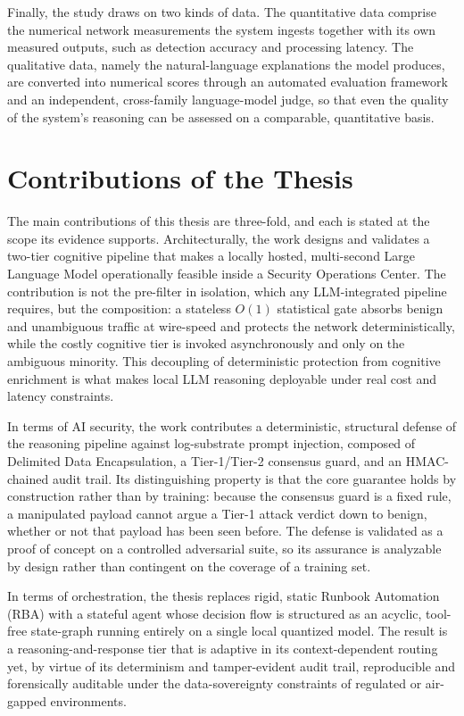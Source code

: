 Finally, the study draws on two kinds of data. The quantitative data comprise the numerical network measurements the system ingests together with its own measured outputs, such as detection accuracy and processing latency. The qualitative data, namely the natural-language explanations the model produces, are converted into numerical scores through an automated evaluation framework~\cite{ragas2023} and an independent, cross-family language-model judge, so that even the quality of the system's reasoning can be assessed on a comparable, quantitative basis.


\section{Contributions of the Thesis}
The main contributions of this thesis are three-fold, and each is stated at the scope its evidence supports. Architecturally, the work designs and validates a two-tier cognitive pipeline that makes a locally hosted, multi-second Large Language Model operationally feasible inside a Security Operations Center. The contribution is not the pre-filter in isolation, which any LLM-integrated pipeline requires, but the composition: a stateless $O(1)$ statistical gate absorbs benign and unambiguous traffic at wire-speed and protects the network deterministically, while the costly cognitive tier is invoked asynchronously and only on the ambiguous minority. This decoupling of deterministic protection from cognitive enrichment is what makes local LLM reasoning deployable under real cost and latency constraints.

In terms of AI security, the work contributes a deterministic, structural defense of the reasoning pipeline against log-substrate prompt injection, composed of Delimited Data Encapsulation, a Tier-1/Tier-2 consensus guard, and an HMAC-chained audit trail. Its distinguishing property is that the core guarantee holds by construction rather than by training: because the consensus guard is a fixed rule, a manipulated payload cannot argue a Tier-1 attack verdict down to benign, whether or not that payload has been seen before. The defense is validated as a proof of concept on a controlled adversarial suite, so its assurance is analyzable by design rather than contingent on the coverage of a training set.

In terms of orchestration, the thesis replaces rigid, static Runbook Automation (RBA) with a stateful agent whose decision flow is structured as an acyclic, tool-free state-graph running entirely on a single local quantized model. The result is a reasoning-and-response tier that is adaptive in its context-dependent routing yet, by virtue of its determinism and tamper-evident audit trail, reproducible and forensically auditable under the data-sovereignty constraints of regulated or air-gapped environments.

